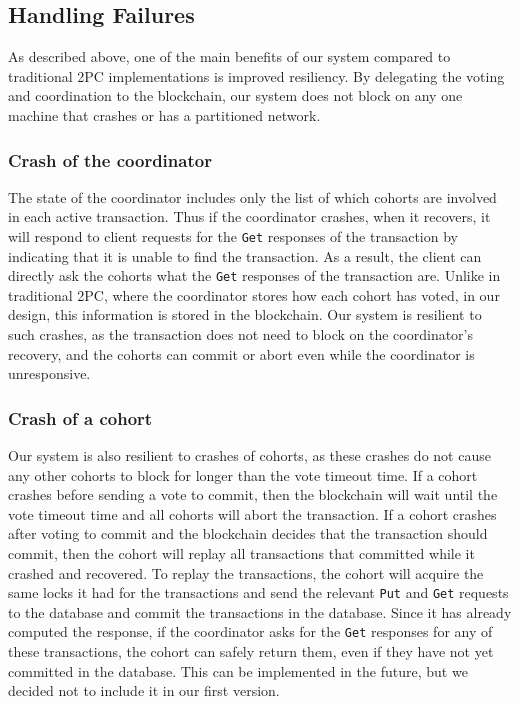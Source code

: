 \documentclass[11pt,conference]{IEEEtran}
\begin{document}
\subsection{Handling Failures} \label{failurecases}
As described above, one of the main benefits of our system compared to traditional 2PC implementations is improved resiliency. By delegating the voting and coordination to the blockchain, our system does not block on any one machine that crashes or has a partitioned network.

\subsubsection{Crash of the coordinator}
The state of the coordinator includes only the list of which cohorts are involved in each active transaction. Thus if the coordinator crashes, when it recovers, it will respond to client requests for the \texttt{Get} responses of the transaction by indicating that it is unable to find the transaction. As a result, the client can directly ask the cohorts what the \texttt{Get} responses of the transaction are. Unlike in traditional 2PC, where the coordinator stores how each cohort has voted, in our design, this information is stored in the blockchain. Our system is resilient to such crashes, as the transaction does not need to block on the coordinator’s recovery, and the cohorts can commit or abort even while the coordinator is unresponsive.

\subsubsection{Crash of a cohort}
Our system is also resilient to crashes of cohorts, as these crashes do not cause any other cohorts to block for longer than the vote timeout time.  If a cohort crashes before sending a vote to commit, then the blockchain will wait until the vote timeout time and all cohorts will abort the transaction. If a cohort crashes after voting to commit and the blockchain decides that the transaction should commit, then the cohort will replay all transactions that committed while it crashed and recovered. To replay the transactions, the cohort will acquire the same locks it had for the transactions and send the relevant \texttt{Put} and \texttt{Get} requests to the database and commit the transactions in the database. Since it has already computed the response, if the coordinator asks for the \texttt{Get} responses for any of these transactions, the cohort can safely return them, even if they have not yet committed in the database. This can be implemented in the future, but we decided not to include it in our first version. 
\end{document}
